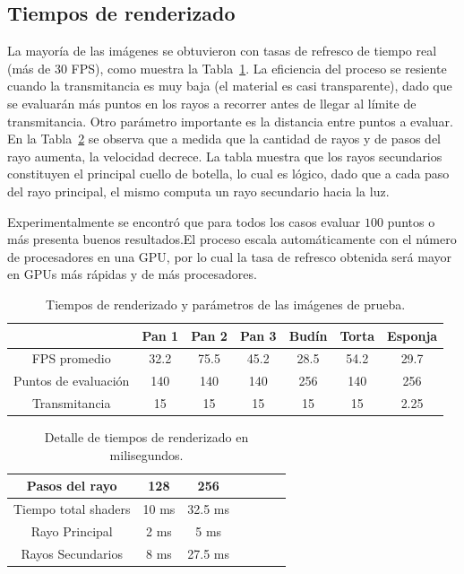 \documentclass[oneside,a4paper,spanish,links]{amca}
\begin{document}
\subsection{Tiempos de renderizado}

La mayoría de las imágenes se obtuvieron con tasas de refresco de
tiempo real (más de 30 FPS), como muestra la Tabla~\ref{tab:n1}. La
eficiencia del proceso se resiente cuando la transmitancia es muy
baja (el material es casi transparente), dado que se evaluarán más
puntos en los rayos a recorrer antes de llegar al límite de
transmitancia. Otro parámetro importante es la distancia entre puntos
a evaluar. En la Tabla~\ref{tab:n2} se observa que a medida que la cantidad de rayos y de pasos del rayo aumenta, la velocidad decrece. La tabla muestra que los rayos secundarios constituyen el principal cuello de botella, lo cual es lógico, dado que a cada paso del rayo principal, el mismo computa un rayo secundario hacia la luz.

Experimentalmente se encontró que para todos los casos
evaluar $100$ puntos o más presenta buenos resultados.El proceso escala
automáticamente con el número de procesadores en una GPU, por lo cual
la tasa de refresco obtenida será mayor en GPUs más rápidas y de más
procesadores.

\begin{table}[htb]
\centering
\begin{tabular}{|c|c|c|c|c|c|c|}
\hline &  Pan 1 & Pan 2 & Pan 3 & Budín & Torta & Esponja \\
\hline
\hline
 FPS promedio  & 32.2 &  75.5 &  45.2 & 28.5 &  54.2 & 29.7\\
\hline
 Puntos de evaluación &  140 &  140 &  140 & 256 &  140 & 256 \\
\hline
 Transmitancia &  15 &  15 &  15 & 15 &  15 & 2.25 \\
\hline
\end{tabular}
\caption{Tiempos de renderizado y parámetros de las imágenes de prueba.}
\label{tab:n1}
\end{table}

\begin{table}[htb]
\centering
\begin{tabular}{|c|c|c|c|c|c|c|}
\hline
 Pasos del rayo         & 128 &  256 \\
\hline
\hline
 Tiempo total shaders   & 10 ms &  32.5 ms \\
\hline
 Rayo Principal         & 2 ms  & 5 ms  \\
\hline
 Rayos Secundarios      &  8 ms & 27.5 ms  \\
\hline
\end{tabular}
\caption{Detalle de tiempos de renderizado en milisegundos.}
\label{tab:n2}
\end{table}
\end{document}
